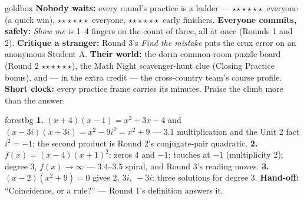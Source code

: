 \documentclass[10pt]{article}
\newcommand{\rung}[1]{{\color{goldacc}\ifcase#1\or$\star$\or$\star\star$\or$\star\star\star$\fi}}
\begin{document}
\begin{skillbox}{goldbox}
\textbf{Nobody waits:} every round's practice is a ladder --- \rung1\ everyone (a quick win),
\rung2\ everyone, \rung3\ early finishers. \textbf{Everyone commits, safely:} \emph{Show me} is
1--4 fingers on the count of three, all at once (Rounds 1 and 2). \textbf{Critique a stranger:}
Round 3's \emph{Find the mistake} puts the crux error on an anonymous Student A.
\textbf{Their world:} the dorm common-room puzzle board (Round 2 \rung3), the Math Night
scavenger-hunt clue (Closing Practice bonus), and --- in the extra credit --- the cross-country
team's course profile. \textbf{Short clock:} every practice frame carries its minutes. Praise the
climb more than the answer.
\end{skillbox}

\begin{skillbox}{forestbg}
\textbf{1.} $(x+4)(x-1)=x^2+3x-4$ and $(x-3i)(x+3i)=x^2-9i^2=x^2+9$ --- 3.1 multiplication and
the Unit 2 fact $i^2=-1$; the second product is Round 2's conjugate-pair quadratic.
\textbf{2.} $f(x)=(x-4)(x+1)^2$: zeros $4$ and $-1$; touches at $-1$ (multiplicity $2$); degree
$3$, $f(x)\to\infty$ --- 3.4--3.5 spiral, and Round 3's reading moves. \textbf{3.} $(x-2)(x^2+9)=0$
gives $2,\ 3i,\ -3i$: three solutions for degree $3$. \textbf{Hand-off:} ``Coincidence, or a
rule?'' --- Round 1's definition answers it.
\end{skillbox}
\end{document}

